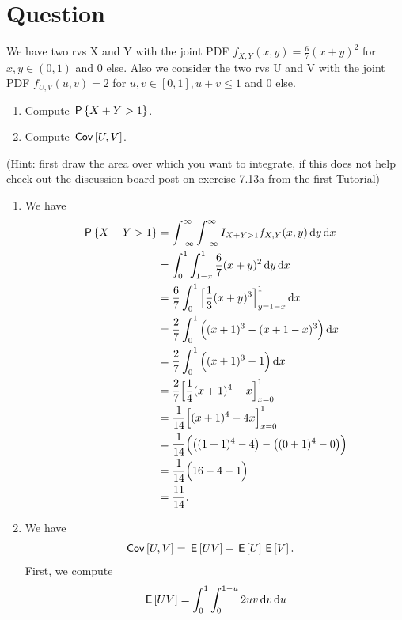 \section{Question}

\begin{exercise}
We have two rvs X and Y with the joint PDF $f_{X,Y}(x,y) = \frac{6}{7}(x+y)^2$ for $x, y \in (0,1)$ and 0 else. Also we consider the two rvs U and V with the joint PDF $f_{U,V}(u,v) = 2$ for $u, v \in [0,1], u+v \leq 1$ and 0 else.
\begin{enumerate}
\item Compute $\P{X+Y>1}$.
\item Compute $\cov{U,V}$.
\end{enumerate}
(Hint: first draw the area over which you want to integrate, if this does not help check out the discussion board post on exercise 7.13a from the first Tutorial)
\begin{solution}
\begin{enumerate}
    \item We have
    \begin{align}
        \P{X+Y>1} &= \int_{-\infty}^\infty \int_{-\infty}^\infty I_{X + Y > 1} f_{X,Y}(x,y) \d y \d x \\
        &= \int_{0}^1 \int_{1-x}^1  \frac{6}{7}(x+y)^2 \d y \d x \\
        &=\frac{6}{7} \int_{0}^1 \Big[\frac{1}{3} (x+y)^3 \Big]_{y=1-x}^1 \d x \\
        &=\frac{2}{7} \int_{0}^1 \Big( (x+1)^3 - (x + 1 - x)^3 \Big) \d x \\
        &=\frac{2}{7} \int_{0}^1 \Big( (x+1)^3 - 1 \Big) \d x \\
        &=\frac{2}{7} \Big[ \frac{1}{4}(x+1)^4 - x \Big]_{x=0}^1 \\
        &=\frac{1}{14}\Big[ (x+1)^4 - 4x \Big]_{x=0}^1 \\
        &=\frac{1}{14} \Big( \big( (1+1)^4 - 4\big) - \big((0+1)^4 - 0 \big) \Big) \\
        &=\frac{1}{14} \Big( 16 - 4 - 1 \Big) \\
        &= \frac{11}{14}.
    \end{align}
    \item We have
    \begin{align}
        \cov{U,V} &= \E{UV} - \E{U}\E{V}.
    \end{align}
    First, we compute
    \begin{align}
        \E{UV} &= \int_0^1 \int_0^{1-u} 2 uv \d v \d u \\

\end{align}
\end{enumerate}
\end{solution}
\end{exercise}
